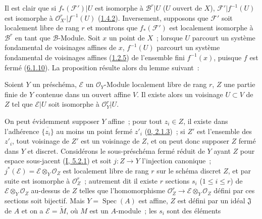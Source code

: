 Il est clair que si $f_*(\mathcal{F}')|U$ est isomorphe à
$\mathcal{B}^r|U$ ($U$ ouvert de $X$), $\mathcal{F}'|f^{-1}(U)$ est isomorphe
à $\mathcal{O}_{X'}^r|f^{-1}(U)$
(\hyperref[II.1.4.2-fr]{1.4.2}). Inversement, supposons que $\mathcal{F}'$
soit localement libre de rang $r$ et montrons que $f_*(\mathcal{F}')$ est
localement isomorphe à $\mathcal{B}^r$ en tant que $\mathcal{B}$-Module. Soit
$x$ un point de $X$~; lorsque $U$ parcourt un système fondamental de
voisinages affines de $x$, $f^{-1}(U)$ parcourt un système fondamental de
voisinages affines (\hyperref[II.1.2.5-fr]{1.2.5}) de l'ensemble fini
$f^{-1}(x)$, puisque $f$ est fermé
(\hyperref[II.6.1.10-fr]{6.1.10}). La proposition résulte alors du lemme
suivant~:

\begin{lemma}[6.1.12.1]
\label{II.6.1.12.1-fr}
Soient $Y$ un préschéma, $\mathcal{E}$ un $\mathcal{O}_Y$-Module localement
libre de rang $r$, $Z$ une partie finie de $Y$ contenue dans un ouvert affine
$V$. Il existe alors un voisinage $U\subset V$ de $Z$ tel que
$\mathcal{E}|U$ soit isomorphe à $\mathcal{O}_Y^r|U$.
\end{lemma}

On peut évidemment supposer $Y$ affine~; pour tout $z_i\in Z$, il existe dans
l'adhérence $\overline{\{z_i\}}$ au moins un point fermé $z'_i$
(\hyperref[0.2.1.3-fr]{0, 2.1.3})~; si $Z'$ est l'ensemble des $z'_i$, tout
voisinage de $Z'$ est un voisinage de $Z$, et on peut donc supposer $Z$ fermé
dans $Y$ et discret. Considérons le sous-préschéma fermé réduit de $Y$ ayant
$Z$ pour espace sous-jacent (\hyperref[I.5.2.1-fr]{I, 5.2.1}) et soit
$j:Z\to Y$ l'injection canonique~; $j^*(\mathcal{E})=\mathcal{E}\otimes_Y
\mathcal{O}_Z$ est localement libre de rang $r$ sur le schéma discret $Z$,
et par suite est isomorphe à $\mathcal{O}_Z^r$~; autrement dit il existe $r$
sections $s_i$ ($1\leq i\leq r$) de $\mathcal{E}\otimes_Y\mathcal{O}_Z$
au-dessus de $Z$ telles que l'homomorphisme
$\mathcal{O}_Z^r\to\mathcal{E}\otimes_Y\mathcal{O}_Z$ défini par ces sections
soit bijectif. Mais $Y=\operatorname{Spec}(A)$ est affine, $Z$ est défini par
un idéal $\mathfrak{J}$ de $A$ et on a $\mathcal{E}=\widetilde{M}$, où $M$
est un $A$-module~; les $s_i$ sont des éléments

